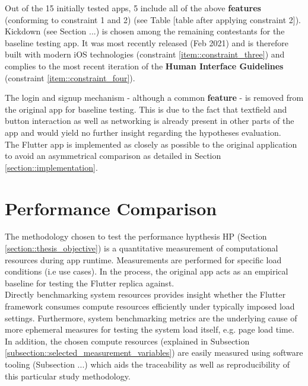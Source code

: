 Out of the 15 initially tested apps, 5 include all of the above \textbf{features} (conforming to
constraint 1 and 2) (see Table [table after applying constraint 2]). Kickdown (see Section ...) is chosen among the remaining 
contestants for the baseline testing app. It was most recently released (Feb 2021) and is therefore built with modern iOS technologies (constraint \ref{item::constraint_three})
and complies to the most recent iteration of the \textbf{Human Interface Guidelines} (constraint \ref{item::constraint_four}).



The login and signup mechanism - although a common \textbf{feature} - is removed from the original
app for baseline testing. This is due to the fact that textfield and button interaction as well
as networking is already present in other parts of the app and would yield no further insight
regarding the hypotheses evaluation.\\
The Flutter app is implemented as closely as possible to the original application to avoid an
asymmetrical comparison as detailed in Section \ref{section::implementation}.

\section{Performance Comparison} \label{section::performance_comparison_design}
The methodology chosen to test the performance hypthesis HP (Section \ref{section::thesis_objective}) is a quantitative
measurement of computational resources during app runtime. Measurements are performed for
specific load conditions (i.e use cases). In the process, the original app acts as an empirical
baseline for testing the Flutter replica against.\\
Directly benchmarking system resources provides insight whether the Flutter framework consumes
compute resources efficiently under typically imposed load settings. Furthermore, system
benchmarking metrics are the underlying cause of more ephemeral measures for testing the
system load itself, e.g. page load time. In addition, the chosen compute resources (explained
in Subsection \ref{subsection::selected_measurement_variables}) are easily measured using software tooling (Subsection ...) which aids the
traceability as well as reproducibility of this particular study methodology.

